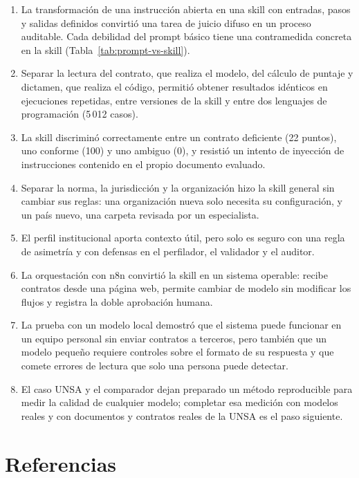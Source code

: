 \documentclass[12pt,letterpaper]{article}
\begin{document}
\begin{enumerate}
  \item La transformación de una instrucción abierta en una skill con entradas, pasos y salidas definidos convirtió una tarea de juicio difuso en un proceso auditable. Cada debilidad del prompt básico tiene una contramedida concreta en la skill (Tabla~\ref{tab:prompt-vs-skill}).
  \item Separar la lectura del contrato, que realiza el modelo, del cálculo de puntaje y dictamen, que realiza el código, permitió obtener resultados idénticos en ejecuciones repetidas, entre versiones de la skill y entre dos lenguajes de programación (5\,012 casos).
  \item La skill discriminó correctamente entre un contrato deficiente (22 puntos), uno conforme (100) y uno ambiguo (0), y resistió un intento de inyección de instrucciones contenido en el propio documento evaluado.
  \item Separar la norma, la jurisdicción y la organización hizo la skill general sin cambiar sus reglas: una organización nueva solo necesita su configuración, y un país nuevo, una carpeta revisada por un especialista.
  \item El perfil institucional aporta contexto útil, pero solo es seguro con una regla de asimetría y con defensas en el perfilador, el validador y el auditor.
  \item La orquestación con n8n convirtió la skill en un sistema operable: recibe contratos desde una página web, permite cambiar de modelo sin modificar los flujos y registra la doble aprobación humana.
  \item La prueba con un modelo local demostró que el sistema puede funcionar en un equipo personal sin enviar contratos a terceros, pero también que un modelo pequeño requiere controles sobre el formato de su respuesta y que comete errores de lectura que solo una persona puede detectar.
  \item El caso UNSA y el comparador dejan preparado un método reproducible para medir la calidad de cualquier modelo; completar esa medición con modelos reales y con documentos y contratos reales de la UNSA es el paso siguiente.
\end{enumerate}

\newpage
\section{Referencias}
\end{document}
